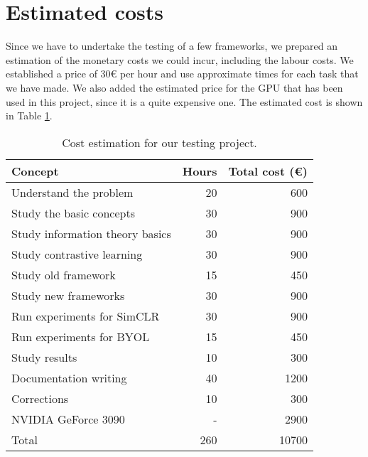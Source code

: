 \section*{Estimated costs}

Since we have to undertake the testing of a few frameworks, we prepared an estimation of the monetary costs we could incur, including the labour costs. We established a price of $30€$ per hour and use approximate times for each task that we have made. We also added the estimated price for the GPU that has been used in this project, since it is a quite expensive one. The estimated cost is shown in Table \ref{table:cost}.

\begin{table}[h!]
    \centering
 
  \begin{tabular}{lrr}
  \toprule
  Concept & Hours  & Total cost (€) \\ \midrule
  Understand the problem   & 20  & 600\\
  Study the basic concepts & 30  & 900\\
  Study information theory basics & 30 & 900 \\
  Study contrastive learning & 30 & 900 \\
  \midrule
  Study old framework & 15 & 450 \\
  Study new frameworks & 30 & 900 \\
  \midrule
  Run experiments for SimCLR & 30 & 900 \\
  Run experiments for BYOL & 15 & 450 \\
  Study results & 10 & 300 \\
  \midrule 
  Documentation writing & 40 & 1200\\
  Corrections & 10 & 300 \\
  \midrule
  NVIDIA GeForce 3090 & - & 2900 \\
  \midrule
  Total & 260 &  10700\\ \bottomrule
  \end{tabular}
  \caption{Cost estimation for our testing project.}
  \label{table:cost}
  \end{table}
